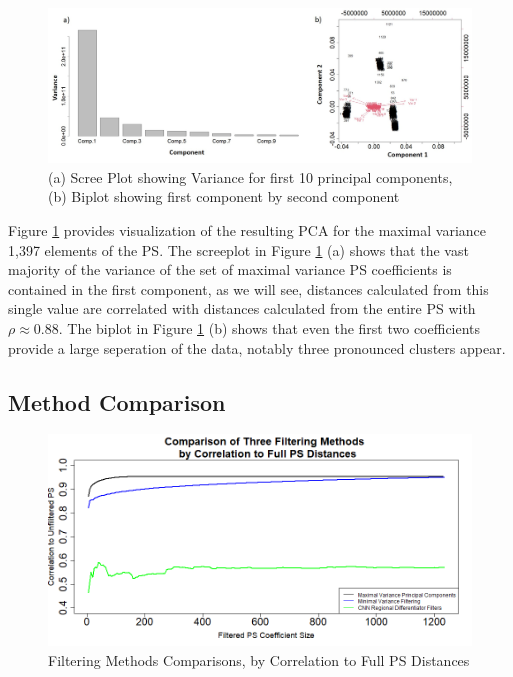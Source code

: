 \documentclass[10pt,conference]{IEEEtran}
\begin{document}
\begin{figure}[h!] 
\centering
\caption{(a) Scree Plot showing Variance for first 10 principal components, (b) Biplot showing first component by second component \label{fig:PCAres}}
\includegraphics[scale=0.26]{Images/Files/PCAResults.jpg}
\end{figure} 

Figure \ref{fig:PCAres} provides visualization of the resulting PCA for the maximal
variance 1,397 elements of the PS.  The screeplot in Figure \ref{fig:PCAres} (a) 
shows that the vast majority of the variance of the set of maximal variance PS 
coefficients is contained in the first component, as we will see, distances calculated from this single value are correlated with distances calculated from the entire PS with $\rho \approx 0.88$.  The biplot in Figure \ref{fig:PCAres} (b) shows that even the first two coefficients provide a large seperation of the data, notably three pronounced clusters appear.
\vspace{-0.5 em}
\subsection{Method Comparison} 
\vspace{-0.5 em}
\begin{figure}[h!]
\centering
\includegraphics[scale=0.25]{Images/Files/PSFiltMethods.PNG}
\vspace{-0.5 em}
\caption{Filtering Methods Comparisons, by Correlation to Full PS Distances \label{fig:filtcomp}}
\end{figure}
\end{document}
